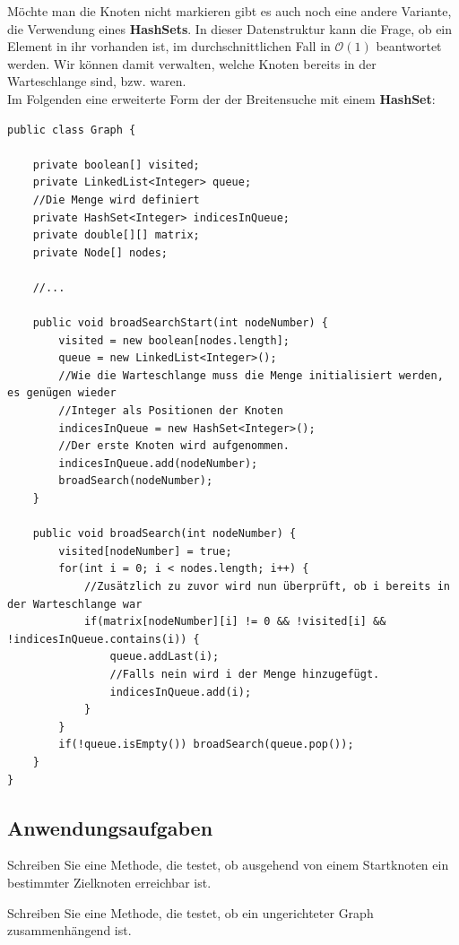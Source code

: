\documentclass{article}
\begin{document}
Möchte man die Knoten nicht  markieren gibt es auch noch eine andere Variante, die Verwendung eines \textbf{HashSets}. In dieser Datenstruktur kann die Frage, ob ein Element in ihr vorhanden ist, im durchschnittlichen Fall in $\mathcal{O}(1)$ beantwortet werden. Wir können damit verwalten, welche Knoten bereits in der Warteschlange sind, bzw. waren. \\
Im Folgenden eine erweiterte Form der der Breitensuche mit einem \textbf{HashSet}:
\begin{verbatim}
public class Graph {

    private boolean[] visited;
    private LinkedList<Integer> queue;
    //Die Menge wird definiert
    private HashSet<Integer> indicesInQueue;
    private double[][] matrix;
    private Node[] nodes;

    //...
    
    public void broadSearchStart(int nodeNumber) {
        visited = new boolean[nodes.length];
        queue = new LinkedList<Integer>();
        //Wie die Warteschlange muss die Menge initialisiert werden, es genügen wieder 
        //Integer als Positionen der Knoten
        indicesInQueue = new HashSet<Integer>();
        //Der erste Knoten wird aufgenommen.
        indicesInQueue.add(nodeNumber);
        broadSearch(nodeNumber);
    }

    public void broadSearch(int nodeNumber) {
        visited[nodeNumber] = true;
        for(int i = 0; i < nodes.length; i++) {
            //Zusätzlich zu zuvor wird nun überprüft, ob i bereits in der Warteschlange war
            if(matrix[nodeNumber][i] != 0 && !visited[i] && !indicesInQueue.contains(i)) {
                queue.addLast(i);
                //Falls nein wird i der Menge hinzugefügt. 
                indicesInQueue.add(i);
            }
        }
        if(!queue.isEmpty()) broadSearch(queue.pop());
    }
}
\end{verbatim}


\newpage
\subsection{Anwendungsaufgaben}

\begin{task}{1}
Schreiben Sie eine Methode, die testet, ob ausgehend von einem Startknoten ein bestimmter Zielknoten erreichbar ist. 
\end{task}

\begin{task}{2}
    Schreiben Sie eine Methode, die testet, ob ein ungerichteter Graph zusammenhängend ist.
\end{task}
\end{document}
